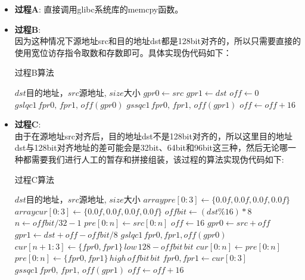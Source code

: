 \begin{itemize}

\item{\textbf{过程A}}: 直接调用glibc系统库的memcpy函数。
\item{\textbf{过程B}}: \\
因为这种情况下源地址src和目的地址dst都是128bit对齐的，所以只需要直接的使用宽位访存指令取数和存数即可。具体实现伪代码如下：

\begin{algorithm}
	\caption{过程B算法}
	\begin{algorithmic}[1] %
		\Require $dst$目的地址，$src$源地址, $size$大小
			\State $gpr0 \gets src$
			\State $gpr1 \gets dst$
			\State $off \gets 0$
				\State $gslqc1\, fpr0,\, fpr1,\, off(gpr0)$
				\State $gssqc1\, fpr0,\, fpr1,\, off(gpr1)$
				\State $off \gets off + 16$
			\EndWhile
		\EndFunction
		\State
	\end{algorithmic}
\end{algorithm}

\item{\textbf{过程C}}: \\
由于在源地址src对齐后，目的地址dst不是128bit对齐的，所以这里目的地址dst与128bit对齐地址的差可能会是32bit、64bit和96bit这三种，然后无论哪一种都需要我们进行人工的暂存和拼接组装，该过程的算法实现伪代码如下:

\begin{algorithm}
	\caption{过程C算法}
	\begin{algorithmic}[1] %
		\Require $dst$目的地址，$src$源地址, $size$大小
			\State $array pre[0:3] \gets \{0.0f, 0.0f, 0.0f, 0.0f\}$
			\State $array cur[0:3] \gets \{0.0f, 0.0f, 0.0f, 0.0f\}$
			\State $offbit \gets (dst \% 16) * 8$
			\State $n \gets offbit/32 - 1$
			\State $pre[0:n] \gets src[0:n]$
			\State $off \gets 16$
			\State $gpr0 \gets src + off$
			\State $gpr1 \gets dst + off - offbit/8$
				\State $gslqc1\, fpr0, fpr1, off(gpr0)$
				\State $cur[n+1:3]  \gets \{fpr0, fpr1\}\, low\, 128-offbit\, bit$
				\State $cur[0:n] \gets pre[0:n]$
				\State $pre[0:n] \gets \{fpr0, fpr1\}\, high\, offbit\, bit$
				\State ${fpr0, fpr1} \gets cur[0:3]$
				\State $gssqc1\, fpr0,\, fpr1,\, off(gpr1)$
				\State $off \gets off + 16$
			\EndWhile
		\EndFunction
	\end{algorithmic}
\end{algorithm}


\end{itemize}
